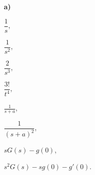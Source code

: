 {
\textbf{a)}\begin{multicols}{3}
\begin{iii}
\item $\dfrac{1}{s}$,
\item $\dfrac{1}{s^2}$,
\item $\dfrac{2}{s^3}$,
\item $\dfrac{3!}{t^4}$,
\item $\frac{1}{s+a}$,
\item $\dfrac{1}{(s+a)^2}$,
\item $ sG(s) - g(0)$,
\item $ s^2G(s) - sg(0) - g'(0)$.
\end{iii}
\end{multicols}
}

